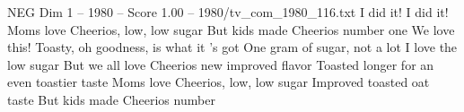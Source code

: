 \begin{textsample}{NEG Dim 1 – 1980 – Score 1.00 – 1980/tv\_com\_1980\_116.txt}  \label{ex:f1_neg_060}
I did it!
I did it!
Moms love Cheerios, low, low sugar But kids made Cheerios number one We love this!
Toasty, oh goodness, is what it 's got One gram of sugar, not a lot I love the low sugar But we all love Cheerios new improved flavor Toasted longer for an even toastier taste Moms love Cheerios, low, low sugar Improved toasted oat taste But kids made Cheerios number

\end{textsample}
